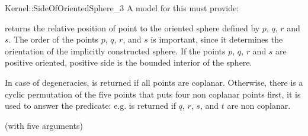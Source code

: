 \begin{ccRefFunctionObjectConcept}{Kernel::SideOfOrientedSphere_3}
A model for this must provide:


         {returns the relative position of point 
          to the oriented sphere defined by $p$, $q$, $r$ and $s$.
          The order of the points $p$, $q$, $r$, and $s$ is important,
          since it determines the orientation of the implicitly
          constructed sphere. If the points $p$, $q$, $r$ and $s$
          are positive oriented, positive side is the bounded interior
          of the sphere. 

In case of degeneracies,  is returned
if all points are coplanar. Otherwise, there is a cyclic permutation of the five points
that puts four non coplanar points first, it is used to answer the predicate:
e.g.  is returned if $q$, $r$, $s$,
and $t$ are non coplanar. }


\ccRefines
{} (with five arguments)

\ccSeeAlso
{} \\


\end{ccRefFunctionObjectConcept}
